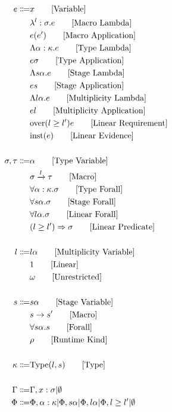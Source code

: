 \documentclass {article}
\begin{document}
\begin{align*}
e \Coloneqq & x \tag*{[Variable]}\\
& \lambda^l : \sigma. e \tag*{[Macro Lambda]}\\
& e(e') \tag*{[Macro Application]}\\
& \Lambda \alpha : \kappa. e \tag*{[Type Lambda]} \\
& e \sigma \tag*{[Type Application]} \\
& \Lambda s \alpha. e \tag*{[Stage Lambda]} \\
& e s \tag*{[Stage Application]} \\
& \Lambda l \alpha. e \tag*{[Multiplicity Lambda]} \\ 
& e l \tag*{[Multiplicity Application]} \\
& \text{over} (l \geq l') e \tag*{[Linear Requirement]}\\
& \text{inst} (e) \tag*{[Linear Evidence]}\\
\\
\sigma, \tau \Coloneqq & \alpha \tag* {[Type Variable]}\\
& \sigma \xrightarrow l \tau \tag*{[Macro]}\\
& \forall \alpha : \kappa. \sigma \tag*{[Type Forall]}\\ 
& \forall s \alpha. \sigma \tag*{[Stage Forall]}\\
& \forall l \alpha. \sigma \tag*{[Linear Forall]}\\
& (l \geq l') \Rightarrow \sigma \tag*{[Linear Predicate]}\\
\\
l \Coloneqq & l \alpha \tag*{[Multiplicity Variable]} \\ 
& 1 \tag*{[Linear]}\\
& \omega \tag*{[Unrestricted]}\\
\\
s \Coloneqq & s \alpha \tag*{[Stage Variable]}\\
& s \to s' \tag*{[Macro]} \\
& \forall s \alpha. s \tag*{[Forall]}\\
& \rho \tag*{[Runtime Kind]}\\
\\
\kappa \Coloneqq & \text{Type} (l,s) \tag*{[Type]}\\
\\
\Gamma \Coloneqq & \Gamma, x : \sigma | \emptyset \\
\Phi \Coloneqq & \Phi, \alpha : \kappa | \Phi, s \alpha | \Phi, l\alpha | \Phi, l \geq l' | \emptyset \\
\end{align*}
\end{document}
